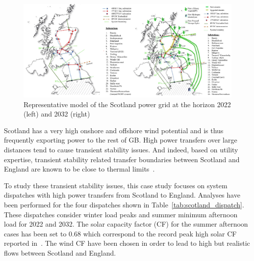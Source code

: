 \begin{figure}
    \centering
    \includegraphics[width=\linewidth]{Figs/Scotland_model.pdf}
    \caption{Representative model of the Scotland power grid at the horizon 2022 (left) and 2032 (right)~\cite{Sam_thesis}}
    \label{fig:scotland_model}
\end{figure}

Scotland has a very high onshore and offshore wind potential and is thus frequently exporting power to the rest of GB. High power transfers over large distances tend to cause transient stability issues. And indeed, based on utility expertise, transient stability related transfer boundaries between Scotland and England are known to be close to thermal limits~\cite{Sam_thesis}.

To study these transient stability issues, this case study focuses on system dispatches with high power transfers from Scotland to England. Analyses have been performed for the four dispatches shown in Table~\ref{tab:scotland_dispatch}. These dispatches consider winter load peaks and summer minimum afternoon load for 2022 and 2032. The solar capacity factor (CF) for the summer afternoon cases has been set to 0.68 which correspond to the record peak high solar CF reported in~\cite{sheffield_pv}. The wind CF have been chosen in order to lead to high but realistic flows between Scotland and England.

